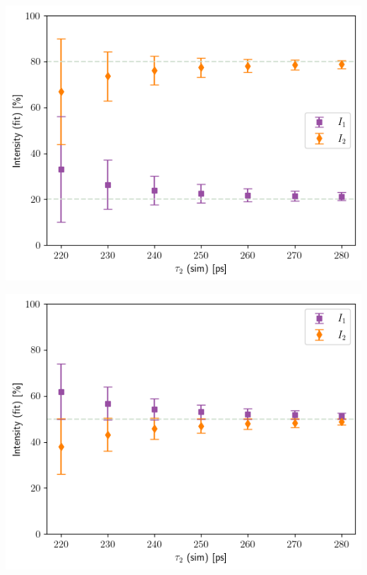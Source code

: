 \vfill
\begin{minipage}{.45\linewidth}
    \centering
    \includegraphics[width=\linewidth]{Batch 1+2/Batch1+2/output/plotfin/2080.png}
    \label{fig:180-2080}
\end{minipage}
\hfill
\begin{minipage}{.45\linewidth}
    \centering
    \includegraphics[width=\linewidth]{Batch 1+2/Batch1+2/output/plotfin/5050.png}
    \label{fig:180-5050}
\end{minipage}
\vfill

